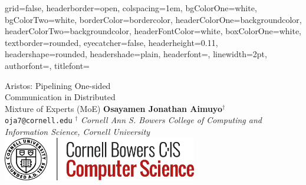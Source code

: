 \documentclass[a0paper,portrait]{baposter}
\begin{document}
    \begin{poster}
    {
        grid=false,
        headerborder=open, %
        colspacing=1em, %
        bgColorOne=white, %
        bgColorTwo=white, %
        borderColor=bordercolor, %
        headerColorOne=backgroundcolor, %
        headerColorTwo=backgroundcolor, %
        headerFontColor=white, %
        boxColorOne=white, %
        textborder=rounded, %
        eyecatcher=false, %
        headerheight=0.11\textheight, %
        headershape=rounded, %
        headershade=plain,
        headerfont=\Large\textsf, %
        linewidth=2pt, %
        authorfont=\large\sffamily\mdseries\setlength\baselineskip{2.2ex}, %
        titlefont=\sffamily\bfseries\Huge\setlength{\baselineskip}{2.2ex}%
    }

%
%
    {
        Aristos: Pipelining One-sided \\ Communication in Distributed \\ Mixture of Experts (MoE)
    }
    {
        \vspace{-0.1em}
        \textbf{Osayamen Jonathan Aimuyo}$^{\dagger}$\vspace{0.1em}\\%
        \small{\texttt{oja7@cornell.edu} \; $^{\dagger}$
            \textit{Cornell Ann S. Bowers College of Computing and Information Science, Cornell University}}
        \vspace{-1.1em}
    }
    {
        \includegraphics[width=8.5cm,keepaspectratio]{figures/cornell}
    }



\end{poster}
\end{document}
